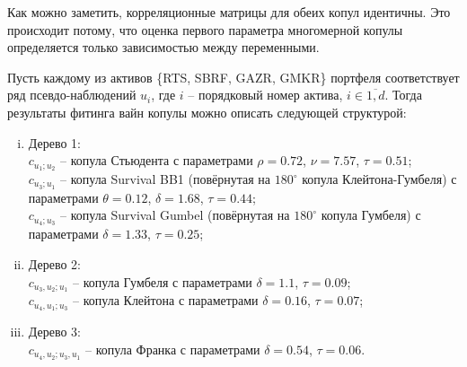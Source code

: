 Как можно заметить, корреляционные матрицы для обеих копул идентичны. 
Это происходит потому, что оценка первого параметра многомерной копулы определяется только зависимостью между переменными.

Пусть каждому из активов \{RTS, SBRF, GAZR, GMKR\} портфеля соответствует ряд псевдо-наблюдений $u_i$, где $i$ -- порядковый номер актива, $i \in \overline{1,d}$. 
Тогда результаты фитинга вайн копулы можно описать следующей структурой:
%
\begin{enumerate}[(i)]
    \item Дерево 1:\\
    $c_{u_1;u_2}$ -- копула Стьюдента с параметрами $\rho=0.72$, $\nu=7.57$, $\tau=0.51$;\\
    $c_{u_3;u_1}$ -- копула Survival BB1 (повёрнутая на $180^{\circ}$ копула Клейтона-Гумбеля) с параметрами $\theta=0.12$, $\delta=1.68$, $\tau=0.44$;\\
    $c_{u_4;u_3}$ -- копула Survival Gumbel (повёрнутая на $180^{\circ}$ копула Гумбеля) с параметрами $\delta=1.33$, $\tau=0.25$;
    \item Дерево 2:\\
    $c_{u_3,u_2;u_1}$ -- копула Гумбеля с параметрами $\delta=1.1$, $\tau=0.09$;\\
    $c_{u_4,u_1;u_3}$ -- копула Клейтона с параметрами $\delta=0.16$, $\tau=0.07$;
    \item Дерево 3:\\
    $c_{u_4,u_2;u_3,u_1}$ -- копула Франка с параметрами $\delta=0.54$, $\tau=0.06$.
\end{enumerate}

